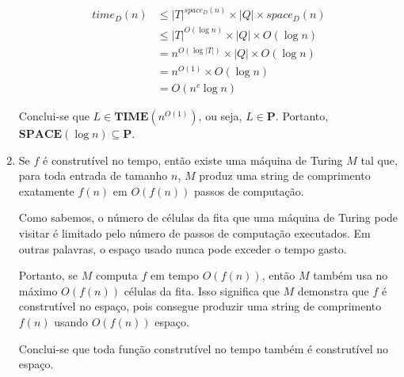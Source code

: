 \documentclass[a4paper,12pt]{article}
\begin{document}
\begin{enumerate}[label=\alph*)]
  \begin{align*}
      time_D(n) &\leq |T|^{space_D(n)} \times |Q| \times space_D(n) \\
      &\leq |T|^{O(\log n)} \times |Q| \times O(\log n) \\
      &= n^{O(\log |T|)} \times |Q| \times O(\log n) \\
      &= n^{O(1)} \times O(\log n) \\
      &= O(n^c \log n)
  \end{align*}

  Conclui-se que $L \in \textbf{TIME}(n^{O(1)})$, ou seja, $L \in \textbf{P}$. Portanto, $\textbf{SPACE}(\log n) \subseteq \textbf{P}$.

  \vspace{0.5cm}
  \item
  Se $f$ é construtível no tempo, então existe uma máquina de Turing $M$ tal que, para toda entrada de tamanho $n$, $M$ produz uma string de comprimento exatamente $f(n)$ em $O(f(n))$ passos de computação.
  
  \vspace{0.3cm}
  Como sabemos, o número de células da fita que uma máquina de Turing pode visitar é limitado pelo número de passos de computação executados. Em outras palavras, o espaço usado nunca pode exceder o tempo gasto.
  
  \vspace{0.3cm}
  Portanto, se $M$ computa $f$ em tempo $O(f(n))$, então $M$ também usa no máximo $O(f(n))$ células da fita. Isso significa que $M$ demonstra que $f$ é construtível no espaço, pois consegue produzir uma string de comprimento $f(n)$ usando $O(f(n))$ espaço.
  
  \vspace{0.3cm}
  Conclui-se que toda função construtível no tempo também é construtível no espaço.
\end{enumerate}

\vspace{1.0cm}
\end{document}
